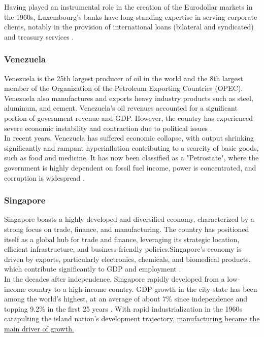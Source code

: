 \documentclass[12pt]{article}
\begin{document}
\noindent Having played an instrumental role in the creation of the Eurodollar markets in the 1960s, Luxembourg's banks have long-standing expertise in serving corporate clients, notably in the provision of international loans (bilateral and syndicated) and treasury services \cite{Luxembourg_2023}.

\subsubsection*{Venezuela}

Venezuela is the 25th largest producer of oil in the world and the 8th largest member of the Organization of the Petroleum Exporting Countries (OPEC). Venezuela also manufactures and exports heavy industry products such as steel, aluminum, and cement. Venezuela's oil revenues accounted for a significant portion of government revenue and GDP. However, the country has experienced severe economic instability and contraction due to political issues \cite{Cheatham_Roy}. \\ 

\noindent In recent years, Venezuela has suffered economic collapse, with output shrinking significantly and rampant hyperinflation contributing to a scarcity of basic goods, such as food and medicine. It has now been classified as a "Petrostate", where the government is highly dependent on fossil fuel income, power is concentrated, and corruption is widespread \cite{Cheatham_Roy}. 

\subsubsection*{Singapore}

Singapore boasts a highly developed and diversified economy, characterized by a strong focus on trade, finance, and manufacturing. The country has positioned itself as a global hub for trade and finance, leveraging its strategic location, efficient infrastructure, and business-friendly policies.Singapore's economy is driven by exports, particularly electronics, chemicals, and biomedical products, which contribute significantly to GDP and employment \cite{Singaporeworldbank}. \\ 

\noindent In the decades after independence, Singapore rapidly developed from a low-income country to a high-income country. GDP growth in the city-state has been among the world’s highest, at an average of about 7\% since independence and topping 9.2\% in the first 25 years \cite{Singaporeworldbank}. With rapid industrialization in the 1960s catapulting the island nation's development trajectory, \href{https://www.worldbank.org/en/country/singapore/overview}{manufacturing became the main driver of growth.} \\ 
\end{document}
